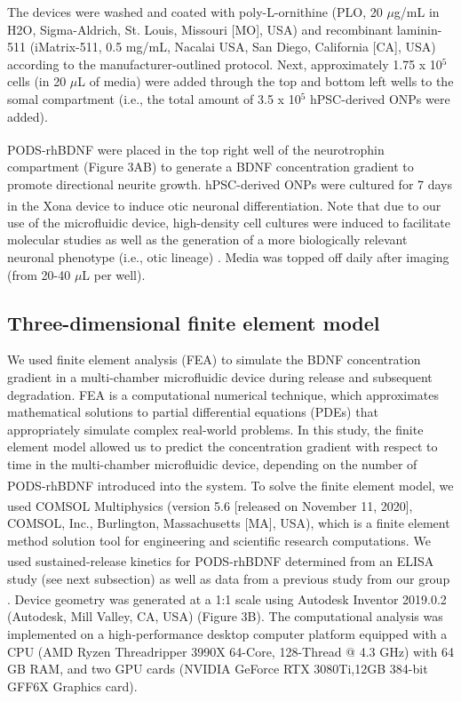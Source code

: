 \documentclass[review]{elsarticle}
\begin{document}
The devices were washed and coated with poly-L-ornithine (PLO, 20 $\mu$g/mL in H\lowercase{2}O, Sigma-Aldrich, St. Louis, Missouri [MO], USA) and recombinant laminin-511 (iMatrix-511, 0.5 mg/mL, Nacalai USA, San Diego, California [CA], USA) according to the manufacturer-outlined protocol. Next, approximately 1.75  x 10$^{5}$ cells (in 20 $\mu$L of media) were added through the top and bottom left wells to the somal compartment (i.e., the total amount of 3.5 x 10$^{5}$ hPSC-derived ONPs were added). 

\indent PODS\textsuperscript{\textregistered}-rhBDNF were placed in the top right well of the neurotrophin compartment (Figure 3A\textendash B) to generate a BDNF concentration gradient to promote directional neurite growth.  hPSC-derived ONPs were cultured for 7 days in the Xona\textsuperscript{\texttrademark} device to induce otic neuronal differentiation. Note that due to our use of the microfluidic device, high-density cell cultures were induced to facilitate molecular studies as well as the generation of a more biologically relevant neuronal phenotype (i.e., otic lineage) \cite{Al-Ali2017a}. Media was topped off daily after imaging (from 20-40 $\mu$L per well).

\subsection{Three-dimensional finite element model}
We used finite element analysis (FEA) to simulate the BDNF concentration gradient in a multi-chamber microfluidic device during release and subsequent degradation. FEA is a computational numerical technique, which approximates mathematical solutions to partial differential equations (PDEs) that appropriately simulate complex real-world problems. In this study, the finite element model allowed us to predict the concentration gradient with respect to time in the multi-chamber microfluidic device, depending on the number of PODS\textsuperscript{\textregistered}-rhBDNF introduced into the system. To solve the finite element model, we used COMSOL\textsuperscript{\textregistered} Multiphysics (version 5.6 [released on November 11, 2020], COMSOL, Inc., Burlington, Massachusetts [MA], USA), which is a finite element method solution tool for engineering and scientific research computations. We used sustained-release kinetics for PODS\textsuperscript{\textregistered}-rhBDNF determined from an ELISA study (see next subsection) as well as data from a previous study from our group \cite{Chang2020}. Device geometry was generated at a 1:1 scale using Autodesk\textsuperscript{\textregistered} Inventor 2019.0.2 (Autodesk, Mill Valley, CA, USA) (Figure 3B). The computational analysis was implemented on a high-performance desktop computer platform equipped with a CPU (AMD Ryzen Threadripper 3990X 64-Core, 128-Thread @ 4.3 GHz) with 64 GB RAM, and two GPU cards (NVIDIA GeForce RTX 3080Ti,12GB 384-bit GFF6X Graphics card).
\end{document}
